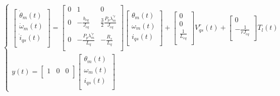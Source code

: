 \documentclass{article}
\begin{document}
\begin{enumerate}[label=\roman*.]
    \begin{equation}
        \begin{cases}
            \begin{bmatrix}
                \dot{\theta}_{m}(t)\\
                \dot{\omega}_{m}(t)\\
                \dot{i}_{qs}(t)\\
            \end{bmatrix} =
            \begin{bmatrix}
                0 & 1 & 0\\
                0 & -\frac{b_{eq}}{J_{eq}} & \frac{3}{2}\frac{P_{p}\lambda_{m}^{\prime r}}{J_{eq}}\\
                0 & -\frac{P_{p}\lambda_{m}^{\prime r}}{L_{q}} & -\frac{R_{s}}{L_{q}}\\
            \end{bmatrix}
            \begin{bmatrix}
                {\theta}_{m}(t)\\
                {\omega}_{m}(t)\\
                {i}_{qs}(t)\\
            \end{bmatrix} +
            \begin{bmatrix}
                0\\
                0\\
                \frac{1}{L_{eq}}\\
            \end{bmatrix} V_{qs}^r(t) +
            \begin{bmatrix}
                0\\
                -\frac{1}{rJ_{eq}}\\
            \end{bmatrix} T_{l}(t)\\
            y(t) =
            \begin{bmatrix}
                1 & 0 & 0\\
            \end{bmatrix}
            \begin{bmatrix}
                {\theta}_{m}(t)\\
                {\omega}_{m}(t)\\
                {i}_{qs}(t)\\
            \end{bmatrix}
        \end{cases}
    \end{equation}
        

\end{enumerate}
\end{document}
